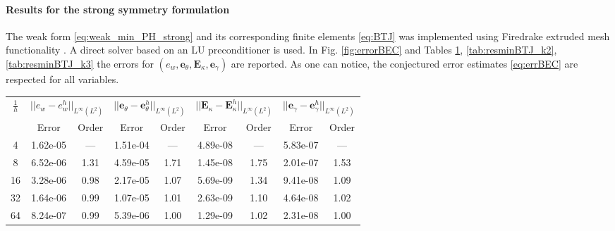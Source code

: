 \paragraph{Results for the strong symmetry formulation} 

The weak form \eqref{eq:weak_min_PH_strong} and its corresponding finite elements \eqref{eq:BTJ} was implemented using Firedrake extruded mesh functionality \cite{mcrae2016}. A direct solver based on an LU preconditioner is used. In Fig. \ref{fig:errorBEC} and Tables \ref{tab:resminBTJ_k1}, \ref{tab:resminBTJ_k2}, \ref{tab:resminBTJ_k3} the errors for $(e_w, \bm{e}_\theta, \bm{E}_\kappa, \bm{e}_\gamma)$ are reported. As one can notice, the conjectured error estimates \eqref{eq:errBEC} are respected for all variables. 

\begin{table}[p]
	\centering
	\begin{tabular}{ccccccccc}
		\hline 
		\multirow{2}{*}{$\frac{1}{h}$} & \multicolumn{2}{c}{$||e_w - e_w^h||_{L^{\infty}(L^2)}$}    & \multicolumn{2}{c}{$||\bm{e}_\theta - \bm{e}_\theta^h||_{L^{\infty}(L^2)}$} & \multicolumn{2}{c}{$||\bm{E}_\kappa - \bm{E}_\kappa^h||_{L^{\infty}(L^2)}$} & \multicolumn{2}{c}{$||\bm{e}_\gamma - \bm{e}_\gamma^ h||_{L^{\infty}(L^2)}$}   \\ 
		& Error & Order  & Error & Order  & Error & Order  & Error & Order   \\ 
		\hline 
		4  & 1.62e-05 & ---  & 1.51e-04 & ---  & 4.89e-08 & ---  & 5.83e-07 & --- \\ 
		8  & 6.52e-06 & 1.31 & 4.59e-05 & 1.71 & 1.45e-08 & 1.75 & 2.01e-07 & 1.53\\ 
		16 & 3.28e-06 & 0.98 & 2.17e-05 & 1.07 & 5.69e-09 & 1.34 & 9.41e-08 & 1.09\\ 
		32 & 1.64e-06 & 0.99 & 1.07e-05 & 1.01 & 2.63e-09 & 1.10 & 4.64e-08 & 1.02\\ 
		64 & 8.24e-07 & 0.99 & 5.39e-06 & 1.00 & 1.29e-09 & 1.02 & 2.31e-08 & 1.00\\ 
		\hline 
	\end{tabular} 
	\captionsetup{width=0.95\linewidth}
	\vspace{1mm}
	\label{tab:resminBTJ_k1}
\end{table}

